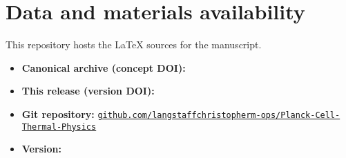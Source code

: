 \section*{Data and materials availability}
This repository hosts the \LaTeX{} sources for the manuscript.

\begin{itemize}
  \item \textbf{Canonical archive (concept DOI):}
  \href{https://doi.org/\RepoConceptDOI}{\RepoConceptDOI}

  \item \textbf{This release (version DOI):}
  \href{https://doi.org/\PaperDOI}{\PaperDOI}

  \item \textbf{Git repository:}
  \href{\RepoGitHubURL}{\texttt{github.com/langstaffchristopherm-ops/Planck-Cell-Thermal-Physics}}

  \item \textbf{Version:} \PaperVersion
\end{itemize}